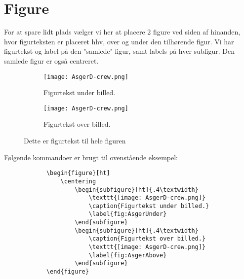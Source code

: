 \documentclass[class=report, crop=false]{standalone}
\begin{document}
    \section{Figure}
    For at spare lidt plads vælger vi her at placere 2 figure ved siden af hinanden, hvor figurteksten er placeret hhv, over og under den tilhørende figur. Vi har figurtekst og label på den "samlede" figur, samt labels på hver subfigur. Den samlede figur er også centreret.
    \begin{figure}[ht]
        \centering
            \begin{subfigure}[ht]{.4\textwidth}
                \texttt{[image: AsgerD-crew.png]}
                \caption{Figurtekst under billed.}
                \label{fig:AsgerUnder}
            \end{subfigure}
            \begin{subfigure}[ht]{.4\textwidth}
                \caption{Figurtekst over billed.}
                \texttt{[image: AsgerD-crew.png]}
                \label{fig:AsgerAbove}
            \end{subfigure}
            \caption{Dette er figurtekst til hele figuren}
            \label{fig:SamledeFigur}
    \end{figure}

    \noindent Følgende kommandoer er brugt til ovenstående eksempel:
    \begin{tcolorbox}\mbox{}
        \begin{verbatim}
            \begin{figure}[ht]
                \centering
                    \begin{subfigure}[ht]{.4\textwidth}
                        \texttt{[image: AsgerD-crew.png]}
                        \caption{Figurtekst under billed.}
                        \label{fig:AsgerUnder}
                    \end{subfigure}
                    \begin{subfigure}[ht]{.4\textwidth}
                        \caption{Figurtekst over billed.}
                        \texttt{[image: AsgerD-crew.png]}
                        \label{fig:AsgerAbove}
                    \end{subfigure}
            \end{figure}
        \end{verbatim}
    \end{tcolorbox}
\end{document}
